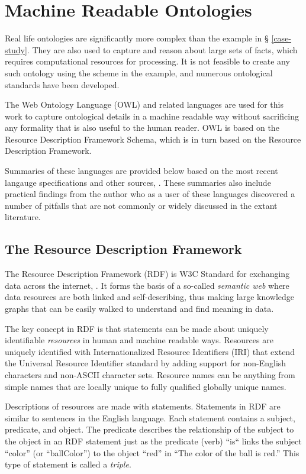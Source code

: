 \section{Machine Readable Ontologies}

Real life ontologies are significantly more complex than the example in \S
\ref{case-study}. They are also used to capture and reason about large sets of
facts, which requires computational resources for processing. It is not feasible
to create any such ontology using the scheme in the example, and numerous
ontological standards have been developed. 

The Web Ontology Language (OWL) and related languages are used for this work to
capture ontological details in a machine readable way without sacrificing any
formality that is also useful to the human reader. OWL is based on the Resource
Description Framework Schema, which is in turn based on the Resource
Description Framework.

Summaries of these languages are provided below based on the most recent
langauge specifications and other sources, \cite{allemang_semantic_2008}. These
summaries also include practical findings from the author who as a user of these languages
discovered a number of pitfalls that are not commonly or widely discussed in the
extant literature.

\subsection{The Resource Description Framework}

The Resource Description Framework (RDF) is  W3C Standard for exchanging data
across the internet, \cite{rdf-w3c,rdf-concepts-syntax}. It forms the basis of a
so-called \textit{semantic web} where data resources are both linked and
self-describing, thus making large knowledge graphs that can be easily walked
to understand and find meaning in data.

The key concept in RDF is that statements can be made about uniquely
identifiable \textit{resources} in human and machine readable ways. Resources
are uniquely identified with Internationalized Resource Identifiers (IRI) that
extend the Universal Resource Identifier standard by adding support for
non-English characters and non-ASCII character sets. Resource names can be
anything from simple names that are locally unique to fully qualified globally
unique names.

Descriptions of resources are made with statements. Statements in RDF are
similar to sentences in the English language. Each statement contains a subject,
predicate, and object. The predicate describes the relationship of the subject
to the object in an RDF statement just as the predicate (verb) ``is`` links the
subject ``color'' (or ``ballColor'') to the object ``red'' in ``The color of
the ball is red.'' This type of statement is called a \textit{triple}.

